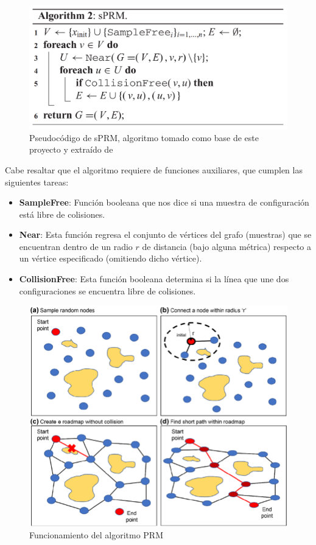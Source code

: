 \documentclass[spanish,mexico]{article}
\numberwithin{equation}{section}
\theoremstyle{definition}
\theoremstyle{remark}
\begin{document}
\begin{figure}[hbtp]
\centering
\includegraphics[scale=0.4]{img/sPRM pscode.png}
\caption{Pseudocódigo de sPRM, algoritmo tomado como base de este proyecto y extraído de \cite{Optimal}}
\end{figure}

Cabe resaltar que el algoritmo requiere de funciones auxiliares, que cumplen las siguientes tareas:
\begin{itemize}
\item \textbf{SampleFree}: Función booleana que nos dice si una muestra de configuración está libre de colisiones.

\item \textbf{Near}: Esta función regresa el conjunto de vértices del grafo (muestras) que se encuentran dentro de un radio $r$ de distancia (bajo alguna métrica) respecto a un vértice especificado (omitiendo dicho vértice).

\item \textbf{CollisionFree}: Esta función booleana determina si la línea que une dos configuraciones se encuentra libre de colisiones.
\end{itemize}
  \begin{figure}[hbtp]
\centering
\includegraphics[scale=0.7]{img/PRM func.png}
\caption{Funcionamiento del algoritmo PRM}
\end{figure}
\end{document}

